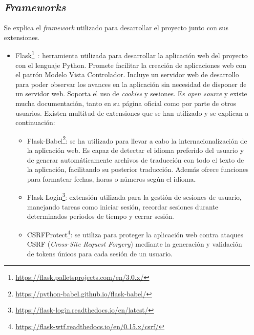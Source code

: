 \subsection{\textit{Frameworks}}
Se explica el \textit{framework} utilizado para desarrollar el proyecto junto con sus extensiones.

\begin{itemize}
\item Flask\footnote{\url{https://flask.palletsprojects.com/en/3.0.x/}}~\cite{flask}: herramienta utilizada para desarrollar la aplicación web del proyecto con el lenguaje Python. Promete facilitar la creación de aplicaciones web con el patrón Modelo Vista Controlador. Incluye un servidor web de desarrollo para poder observar los avances en la aplicación sin necesidad de disponer de un servidor web. Soporta el uso de \textit{cookies} y sesiones. Es \textit{open source} y existe mucha documentación, tanto en su página oficial como por parte de otros usuarios. Existen multitud de extensiones que se han utilizado y se explican a continuación:

\begin{itemize}
    \item Flask-Babel\footnote{\url{https://python-babel.github.io/flask-babel/}}: se ha utilizado para llevar a cabo la internacionalización de la aplicación web. Es capaz de detectar el idioma preferido del usuario y de generar automáticamente archivos de traducción con todo el texto de la aplicación, facilitando su posterior traducción. Además ofrece funciones para formatear fechas, horas o números según el idioma.
    \item Flask-Login\footnote{\url{https://flask-login.readthedocs.io/en/latest/}}: extensión utilizada para la gestión de sesiones de usuario, manejando tareas como iniciar sesión, recordar sesiones durante determinados periodos de tiempo y cerrar sesión.
    \item CSRFProtect\footnote{\url{https://flask-wtf.readthedocs.io/en/0.15.x/csrf/}}: se utiliza para proteger la aplicación web contra ataques CSRF (\textit{Cross-Site Request Forgery}) mediante la generación y validación de tokens únicos para cada sesión de un usuario.
\end{itemize}
\end{itemize}


